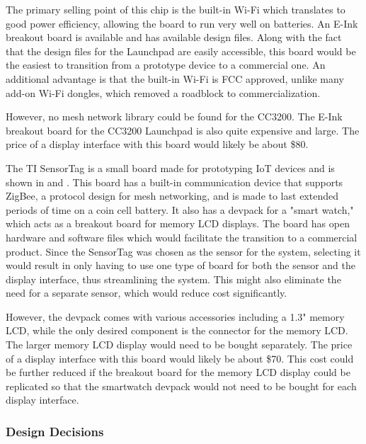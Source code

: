 \documentclass[PPFS.tex]{template/subfiles}
\begin{document}
The primary selling point of this chip is the built-in Wi-Fi which translates to good power efficiency, allowing the board to run very well on batteries. An E-Ink breakout board is available and has available design files. Along with the fact that the design files for the Launchpad are easily accessible, this board would be the easiest to transition from a prototype device to a commercial one. An additional advantage is that the built-in Wi-Fi is FCC approved, unlike many add-on Wi-Fi dongles, which removed a roadblock to commercialization.

However, no mesh network library could be found for the CC3200. The E-Ink breakout board for the CC3200 Launchpad is also quite expensive and large. The price of a display interface with this board would likely be about \$80.

The TI SensorTag is a small board made for prototyping IoT devices and is shown in  and . This board has a built-in communication device that supports ZigBee, a protocol design for mesh networking, and is made to last extended periods of time on a coin cell battery. It also has a devpack for a "smart watch," which acts as a breakout board for memory LCD displays. The board has open hardware and software files which would facilitate the transition to a commercial product. Since the SensorTag was chosen as the sensor for the system, selecting it would result in only having to use one type of board for both the sensor and the display interface, thus streamlining the system. This might also eliminate the need for a separate sensor, which would reduce cost significantly.

However, the devpack comes with various accessories including a 1.3" memory LCD, while the only desired component is the connector for the memory LCD. The larger memory LCD display would need to be bought separately. The price of a display interface with this board would likely be about \$70. This cost could be further reduced if the breakout board for the memory LCD display could be replicated so that the smartwatch devpack would not need to be bought for each display interface.

\subsubsection{Design Decisions}
\end{document}
